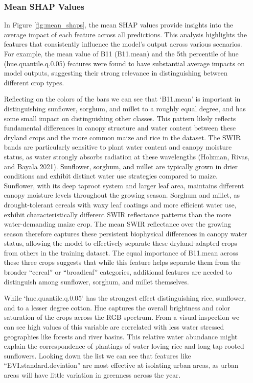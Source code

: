 \documentclass[
  journal,
  twocolumn]{IEEEtran}
\begin{document}
\hypertarget{mean-shap-values}{%
\subsubsection{Mean SHAP Values}\label{mean-shap-values}}

In Figure \ref{fig:mean_shaps}, the mean SHAP values provide insights
into the average impact of each feature across all predictions. This
analysis highlights the features that consistently influence the model's
output across various scenarios. For example, the mean value of B11
(B11.mean) and the 5th percentile of hue (hue.quantile.q.0.05) features
were found to have substantial average impacts on model outputs,
suggesting their strong relevance in distinguishing between different
crop types.

Reflecting on the colors of the bars we can see that `B11.mean' is
important in distinguishing sunflower, sorghum, and millet to a roughly
equal degree, and has some small impact on distinguishing other classes.
This pattern likely reflects fundamental differences in canopy structure
and water content between these dryland crops and the more common maize
and rice in the dataset. The SWIR bands are particularly sensitive to
plant water content and canopy moisture status, as water strongly
absorbs radiation at these wavelengths (Holzman, Rivas, and Bayala
2021). Sunflower, sorghum, and millet are typically grown in drier
conditions and exhibit distinct water use strategies compared to maize.
Sunflower, with its deep taproot system and larger leaf area, maintains
different canopy moisture levels throughout the growing season. Sorghum
and millet, as drought-tolerant cereals with waxy leaf coatings and more
efficient water use, exhibit characteristically different SWIR
reflectance patterns than the more water-demanding maize crop. The mean
SWIR reflectance over the growing season therefore captures these
persistent biophysical differences in canopy water status, allowing the
model to effectively separate these dryland-adapted crops from others in
the training dataset. The equal importance of B11.mean across these
three crops suggests that while this feature helps separate them from
the broader ``cereal'' or ``broadleaf'' categories, additional features
are needed to distinguish among sunflower, sorghum, and millet
themselves.

While `hue.quantile.q.0.05' has the strongest effect distinguishing
rice, sunflower, and to a lesser degree cotton. Hue captures the overall
brightness and color saturation of the crops across the RGB spectrum.
From a visual inspection we can see high values of this variable are
correlated with less water stressed geographies like forests and river
basins. This relative water abundance might explain the correspondence
of plantings of water loving rice and long tap rooted sunflowers.
Looking down the list we can see that features like
``EVI.standard.deviation'' are most effective at isolating urban areas,
as urban areas will have little variation in greenness across the year.
\end{document}
